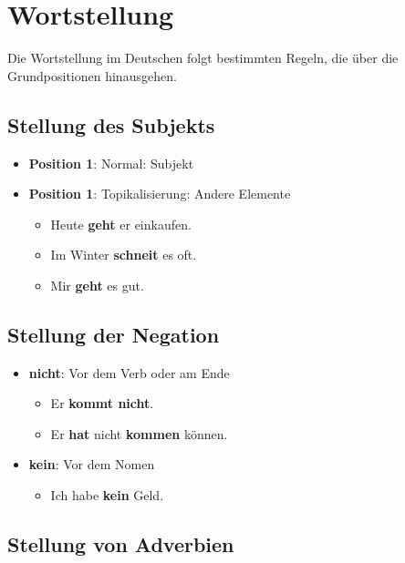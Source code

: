 \chapter{Wortstellung}
\label{cha:Wortstellung}

Die Wortstellung im Deutschen folgt bestimmten Regeln, die über die Grundpositionen hinausgehen.

\section{Stellung des Subjekts}
\label{sec:SubjektStellung}

\begin{itemize}
    \item \textbf{Position 1}: Normal: Subjekt
    \item \textbf{Position 1}: Topikalisierung: Andere Elemente
        \begin{itemize}
            \item Heute \textbf{geht} er einkaufen.
            \item Im Winter \textbf{schneit} es oft.
            \item Mir \textbf{geht} es gut.
        \end{itemize}
\end{itemize}

\section{Stellung der Negation}
\label{sec:NegationStellung}

\begin{itemize}
    \item \textbf{nicht}: Vor dem Verb oder am Ende
        \begin{itemize}
            \item Er \textbf{kommt nicht}.
            \item Er \textbf{hat} nicht \textbf{kommen} können.
        \end{itemize}
    \item \textbf{kein}: Vor dem Nomen
        \begin{itemize}
            \item Ich habe \textbf{kein} Geld.
        \end{itemize}
\end{itemize}

\section{Stellung von Adverbien}
\label{sec:AdverbStellung}

